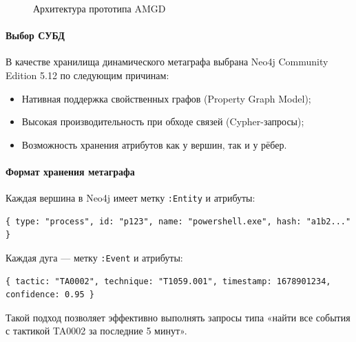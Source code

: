 \begin{figure}[h]
\centering
{}
\caption{Архитектура прототипа AMGD}
\label{fig:amgd_arch_impl}
\end{figure}

\paragraph{Выбор СУБД}
В качестве хранилища динамического метаграфа выбрана Neo4j Community Edition 5.12 по следующим причинам:
\begin{itemize}
    \item Нативная поддержка свойственных графов (Property Graph Model);
    \item Высокая производительность при обходе связей (Cypher-запросы);
    \item Возможность хранения атрибутов как у вершин, так и у рёбер.
\end{itemize}

\paragraph{Формат хранения метаграфа}
Каждая вершина в Neo4j имеет метку \texttt{:Entity} и атрибуты:
\begin{verbatim}
{ type: "process", id: "p123", name: "powershell.exe", hash: "a1b2..." }
\end{verbatim}
Каждая дуга — метку \texttt{:Event} и атрибуты:
\begin{verbatim}
{ tactic: "TA0002", technique: "T1059.001", timestamp: 1678901234, confidence: 0.95 }
\end{verbatim}
Такой подход позволяет эффективно выполнять запросы типа «найти все события с тактикой TA0002 за последние 5 минут».


